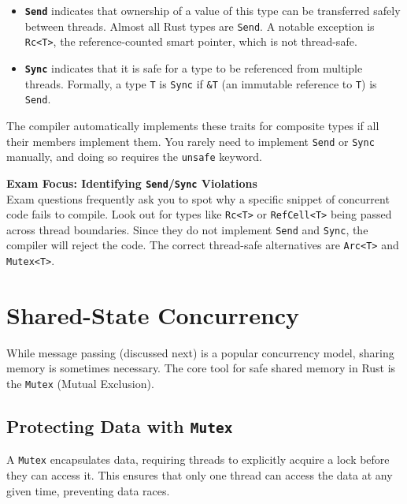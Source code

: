 \begin{itemize}
    \item \textbf{\texttt{Send}} indicates that ownership of a value of this type can be transferred safely between threads. Almost all Rust types are \texttt{Send}. A notable exception is \texttt{Rc<T>}, the reference-counted smart pointer, which is not thread-safe.
    \item \textbf{\texttt{Sync}} indicates that it is safe for a type to be referenced from multiple threads. Formally, a type \texttt{T} is \texttt{Sync} if \texttt{\&T} (an immutable reference to \texttt{T}) is \texttt{Send}.
\end{itemize}

The compiler automatically implements these traits for composite types if all their members implement them. You rarely need to implement \texttt{Send} or \texttt{Sync} manually, and doing so requires the \texttt{unsafe} keyword.

\begin{exambox}
\textbf{Exam Focus: Identifying \texttt{Send}/\texttt{Sync} Violations} \\
Exam questions frequently ask you to spot why a specific snippet of concurrent code fails to compile. Look out for types like \texttt{Rc<T>} or \texttt{RefCell<T>} being passed across thread boundaries. Since they do not implement \texttt{Send} and \texttt{Sync}, the compiler will reject the code. The correct thread-safe alternatives are \texttt{Arc<T>} and \texttt{Mutex<T>}.
\end{exambox}

\section{Shared-State Concurrency}

While message passing (discussed next) is a popular concurrency model, sharing memory is sometimes necessary. The core tool for safe shared memory in Rust is the \texttt{Mutex} (Mutual Exclusion).

\subsection{Protecting Data with \texttt{Mutex}}

A \texttt{Mutex} encapsulates data, requiring threads to explicitly acquire a lock before they can access it. This ensures that only one thread can access the data at any given time, preventing data races.

